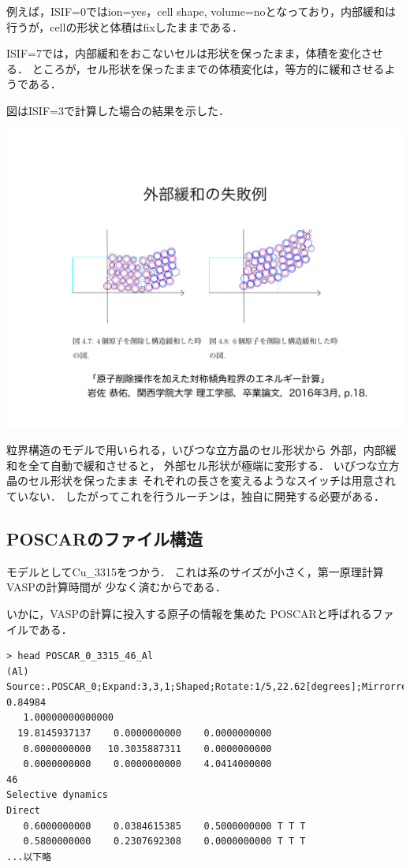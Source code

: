 例えば，ISIF=0ではion=yes，cell shape,
volume=noとなっており，内部緩和は行うが，cellの形状と体積はfixしたままである．

ISIF=7では，内部緩和をおこないセルは形状を保ったまま，体積を変化させる．
ところが，セル形状を保ったままでの体積変化は，等方的に緩和させるようである．

図はISIF=3で計算した場合の結果を示した．
\begin{center}
\includegraphics[width=150mm]{../.././figs/thesis/thesis_004.jpeg}
\end{center}


\label{fig:}
粒界構造のモデルで用いられる，いびつな立方晶のセル形状から
外部，内部緩和を全て自動で緩和させると， 外部セル形状が極端に変形する．
いびつな立方晶のセル形状を保ったまま
それぞれの長さを変えるようなスイッチは用意されていない．
したがってこれを行うルーチンは，独自に開発する必要がある．

    \subsection{POSCARのファイル構造}\label{poscarux306eux30d5ux30a1ux30a4ux30ebux69cbux9020}

モデルとしてCu\_3315をつかう．
これは系のサイズが小さく，第一原理計算VASPの計算時間が
少なく済むからである．

いかに，VASPの計算に投入する原子の情報を集めた
POSCARと呼ばれるファイルである．

\begin{verbatim}
> head POSCAR_0_3315_46_Al
(Al) Source:.POSCAR_0;Expand:3,3,1;Shaped;Rotate:1/5,22.62[degrees];Mirrorred;Shaped2;Cut:0.81715-0.84984
   1.00000000000000
  19.8145937137    0.0000000000    0.0000000000
   0.0000000000   10.3035887311    0.0000000000
   0.0000000000    0.0000000000    4.0414000000
46
Selective dynamics
Direct
   0.6000000000    0.0384615385    0.5000000000 T T T
   0.5800000000    0.2307692308    0.0000000000 T T T
...以下略
\end{verbatim}


